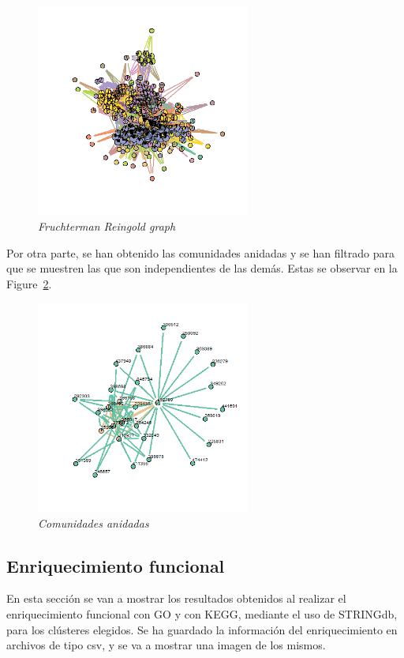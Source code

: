 \begin{figure}[h]
	\centering
	\includegraphics[width=70mm,scale=1.2]{figures/hits.network_layout_fruchterman.reingold_shownodesin_10.png}
	\caption{\textit{Fruchterman Reingold graph}}
	\label{FRg}
\end{figure}

Por otra parte, se han obtenido las comunidades anidadas y se han filtrado para que se muestren las que son independientes de las demás. Estas se observar en la Figure~\ref{anidadas}.

\begin{figure}[h]
	\centering
	\includegraphics[width=70mm,scale=1.2]{figures/nested_comm.png}
	\caption{\textit{Comunidades anidadas}}
	\label{anidadas}
\end{figure}

\subsection{Enriquecimiento funcional}

En esta sección se van a mostrar los resultados obtenidos al realizar el enriquecimiento funcional con GO y con KEGG, mediante el uso de STRINGdb, para los clústeres elegidos.
Se ha guardado la información del enriquecimiento en archivos de tipo csv, y se va a mostrar una imagen de los mismos.

